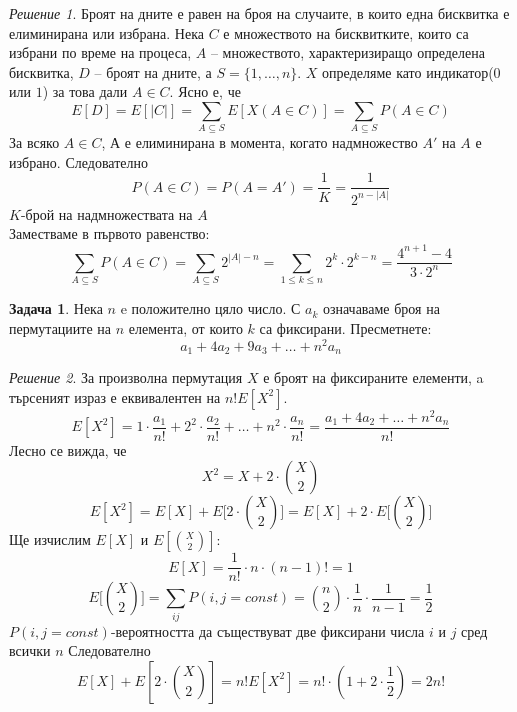 \documentclass[11 pt, a4paper]{article}
\theoremstyle{definition}
\newtheorem{p}{Задача}
\theoremstyle{remark}
\newtheorem*{s}{Решение}
\begin{document}
\begin{s}
Броят на дните е равен на броя на случаите, в които една бисквитка е елиминирана или избрана. Нека $C$ е множеството на бисквитките, които са избрани по време на процеса, $A$ -- множеството, характеризиращо определена бисквитка, $D$ -- броят на дните, а $S=\big\{1,\dots,n\big\}$. $X$ определяме като индикатор($0$ или $1$) за това дали $A\in C$. Ясно е, че
\begin{equation*}
E[D]=E[\left|C\right|]=\sum_{A\subseteq S}E[X(A\in C)]=\sum_{A\subseteq S}P(A\in C)
\end{equation*}
За всяко $A\in C$, $А$ е елиминирана в момента, когато надмножество $A'$ на $A$ е избрано. Следователно
\begin{equation*}
P(A\in C)=P(A=A')=\dfrac{1}{K}=\dfrac{1}{2^{n-\left|A\right|}}
\end{equation*}
$K$-брой на надмножествата на $A$\\
Заместваме в първото равенство:
\begin{equation*}
\sum_{A\subseteq S}P(A\in C)=\sum_{A\subseteq S}2^{\left|A\right|-n}=\sum_{1\leq k\leq n} 2^k\cdot2^{k-n}=\dfrac{4^{n+1}-4}{3\cdot2^n}
\end{equation*}
\end{s}
\begin{p}
Нека $n$ e положително цяло число. С $a_k$ означаваме броя на пермутациите на $n$ елемента, от които $k$ са фиксирани. Пресметнете:
\begin{equation*}
a_1+4a_2+9a_3+\dots+n^2a_n
\end{equation*}
\end{p}
\begin{s}
За произволна пермутация $X$ е броят на фиксираните елементи, a търсеният израз е еквивалентен на $n!E[X^2]$.
\begin{equation*}
E[X^2]=1\cdot\dfrac{a_1}{n!}+2^2\cdot\dfrac{a_2}{n!}+\dots+n^2\cdot\dfrac{a_n}{n!}=\dfrac{a_1+4a_2+\dots+n^2a_n}{n!}
\end{equation*}Лесно се вижда, че 
\begin{equation*}
X^2=X+2\cdot{X\choose{2}}
\end{equation*}
\begin{equation*}
E[X^2]=E[X]+E\bigg[2\cdot{X\choose{2}}\bigg]=E[X]+2\cdot E\bigg[{X\choose{2}}\bigg]
\end{equation*}
Ще изчислим $E[X]$ и $E[{X\choose{2}}]$:
\begin{equation*}
E[X]=\dfrac{1}{n!}\cdot n\cdot(n-1)!=1
\end{equation*}
\begin{equation*}
E\bigg[{X\choose{2}}\bigg]=\sum_{ij}P(i,j=const)={n\choose{2}}\cdot\dfrac{1}{n}\cdot\dfrac{1}{n-1}=\dfrac{1}{2}
\end{equation*}
$P(i,j=const)$-вероятността да съществуват две фиксирани числа $i$ и $j$ сред всички $n$
Следователно
\begin{equation*}
E[X]+E[2\cdot{X\choose{2}}]=n!E[X^2]=n!\cdot(1+2\cdot\dfrac{1}{2})=2n!
\end{equation*}
\end{s}
\end{document}
